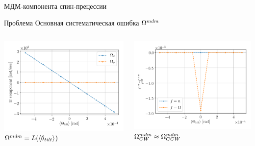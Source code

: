 \documentclass[14pt]{beamer}
\newcommand{\Wmdm}{\W^{mdm}}
\begin{document}
\begin{frame}{МДМ-компонента спин-прецессии}
	\begin{block}{Проблема}
		Основная систематическая ошибка $\Wmdm$
	\end{block}
\begin{columns}
	\begin{column}{.5\linewidth}\centering
		\includegraphics[width=\linewidth]{fake_signal_sim/linearity_test_shifting_gauss_freq}
		$\Wmdm = L(\avg{\theta_{tilt}})$
	\end{column}
	\begin{column}{.5\linewidth}\centering
		\includegraphics[width=\linewidth]{fake_signal_sim/linearity_test_shifting_gauss_rel_diff}
		$\Wmdm_{CW} \approx \Wmdm_{CCW}$

\end{column}
\end{columns}
\end{frame}
\end{document}
